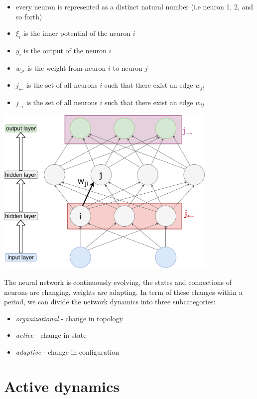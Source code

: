 \begin{itemize}
  \item every neuron is represented as a distinct natural number (i.e neuron 1, 2, and so forth)
  \item $\xi_i$ is the inner potential of the neuron $i$
  \item $y_i$ is the output of the neuron $i$
  \item $w_{ji}$ is the weight from neuron $i$ to neuron $j$
  \item $j_{\leftarrow}$ is the set of all neurons $i$ such that there exist an edge $w_{ji}$
  \item $j_{\rightarrow}$ is the set of all neurons $i$ such that there exist an edge $w_{ij}$

\end{itemize}

\includegraphics[width=0.8\textwidth]{tex/images/ann}

The neural network is continuously evolving, the states and connections of neurons are changing, weights are adapting. In term of these changes within a period, we can divide the network dynamics into three subcategories:

\begin{itemize}
  \item \textit{organizational} - change in topology
  \item \textit{active} - change in state
  \item \textit{adaptive} - change in configuration
\end{itemize}

\section{Active dynamics}

